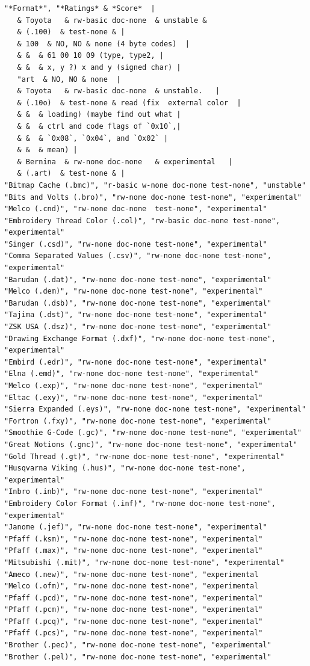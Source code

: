 \documentclass[10pt]{report}
\begin{document}
\begin{verbatim}
"*Format*", "*Ratings* & *Score*  |
   & Toyota   & rw-basic doc-none  & unstable & 
   & (.100)  & test-none & |
   & 100  & NO, NO & none (4 byte codes)  |
   & &  & 61 00 10 09 (type, type2, |
   & &  & x, y ?) x and y (signed char) |
   "art  & NO, NO & none  |
   & Toyota   & rw-basic doc-none  & unstable.   |
   & (.10o)  & test-none & read (fix  external color  |
   & &  & loading) (maybe find out what |
   & &  & ctrl and code flags of `0x10`,|
   & &  & `0x08`, `0x04`, and `0x02` |
   & &  & mean) |
   & Bernina  & rw-none doc-none   & experimental   |
   & (.art)  & test-none & |
"Bitmap Cache (.bmc)", "r-basic w-none doc-none test-none", "unstable" 
"Bits and Volts (.bro)", "rw-none doc-none test-none", "experimental"
"Melco (.cnd)", "rw-none doc-none  test-none", "experimental"
"Embroidery Thread Color (.col)", "rw-basic doc-none test-none", "experimental"
"Singer (.csd)", "rw-none doc-none test-none", "experimental"
"Comma Separated Values (.csv)", "rw-none doc-none test-none", "experimental"
"Barudan (.dat)", "rw-none doc-none test-none", "experimental"
"Melco (.dem)", "rw-none doc-none test-none", "experimental"
"Barudan (.dsb)", "rw-none doc-none test-none", "experimental"
"Tajima (.dst)", "rw-none doc-none test-none", "experimental"
"ZSK USA (.dsz)", "rw-none doc-none test-none", "experimental"
"Drawing Exchange Format (.dxf)", "rw-none doc-none test-none", "experimental"
"Embird (.edr)", "rw-none doc-none test-none", "experimental"
"Elna (.emd)", "rw-none doc-none test-none", "experimental"
"Melco (.exp)", "rw-none doc-none test-none", "experimental"
"Eltac (.exy)", "rw-none doc-none test-none", "experimental"
"Sierra Expanded (.eys)", "rw-none doc-none test-none", "experimental"
"Fortron (.fxy)", "rw-none doc-none test-none", "experimental"
"Smoothie G-Code (.gc)", "rw-none doc-none test-none", "experimental"
"Great Notions (.gnc)", "rw-none doc-none test-none", "experimental"
"Gold Thread (.gt)", "rw-none doc-none test-none", "experimental"
"Husqvarna Viking (.hus)", "rw-none doc-none test-none", "experimental"
"Inbro (.inb)", "rw-none doc-none test-none", "experimental"
"Embroidery Color Format (.inf)", "rw-none doc-none test-none", "experimental"
"Janome (.jef)", "rw-none doc-none test-none", "experimental"
"Pfaff (.ksm)", "rw-none doc-none test-none", "experimental"
"Pfaff (.max)", "rw-none doc-none test-none", "experimental"
"Mitsubishi (.mit)", "rw-none doc-none test-none", "experimental"
"Ameco (.new)", "rw-none doc-none test-none", "experimental
"Melco (.ofm)", "rw-none doc-none test-none", "experimental
"Pfaff (.pcd)", "rw-none doc-none test-none", "experimental"
"Pfaff (.pcm)", "rw-none doc-none test-none", "experimental"
"Pfaff (.pcq)", "rw-none doc-none test-none", "experimental"
"Pfaff (.pcs)", "rw-none doc-none test-none", "experimental"
"Brother (.pec)", "rw-none doc-none test-none", "experimental"
"Brother (.pel)", "rw-none doc-none test-none", "experimental"


\end{verbatim}
\end{document}

